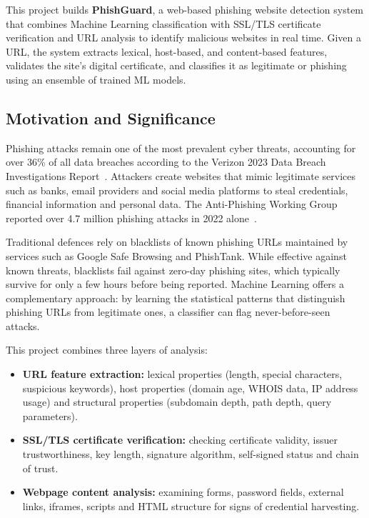\documentclass[11pt,a4paper]{article}
\begin{document}
This project builds \textbf{PhishGuard}, a web-based phishing website detection system that combines Machine Learning classification with SSL/TLS certificate verification and URL analysis to identify malicious websites in real time. Given a URL, the system extracts lexical, host-based, and content-based features, validates the site's digital certificate, and classifies it as legitimate or phishing using an ensemble of trained ML models.

\subsection{Motivation and Significance}

Phishing attacks remain one of the most prevalent cyber threats, accounting for over 36\% of all data breaches according to the Verizon 2023 Data Breach Investigations Report~\cite{verizon2023}. Attackers create websites that mimic legitimate services such as banks, email providers and social media platforms to steal credentials, financial information and personal data. The Anti-Phishing Working Group reported over 4.7 million phishing attacks in 2022 alone~\cite{apwg2023}.

Traditional defences rely on blacklists of known phishing URLs maintained by services such as Google Safe Browsing and PhishTank. While effective against known threats, blacklists fail against zero-day phishing sites, which typically survive for only a few hours before being reported. Machine Learning offers a complementary approach: by learning the statistical patterns that distinguish phishing URLs from legitimate ones, a classifier can flag never-before-seen attacks.

This project combines three layers of analysis:
\begin{itemize}
  \item \textbf{URL feature extraction:} lexical properties (length, special characters, suspicious keywords), host properties (domain age, WHOIS data, IP address usage) and structural properties (subdomain depth, path depth, query parameters).
  \item \textbf{SSL/TLS certificate verification:} checking certificate validity, issuer trustworthiness, key length, signature algorithm, self-signed status and chain of trust.
  \item \textbf{Webpage content analysis:} examining forms, password fields, external links, iframes, scripts and HTML structure for signs of credential harvesting.
\end{itemize}
\end{document}
